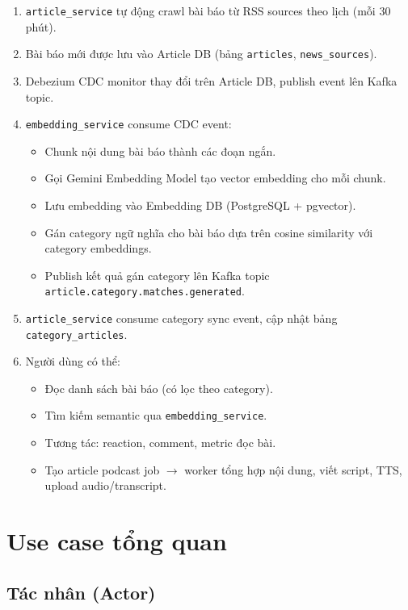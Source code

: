 \documentclass[14pt,a4paper,oneside]{extreport}
\begin{document}
\begin{enumerate}[leftmargin=2cm]
  \item \texttt{article\_service} tự động crawl bài báo từ RSS sources theo lịch (mỗi 30 phút).
  \item Bài báo mới được lưu vào Article DB (bảng \texttt{articles}, \texttt{news\_sources}).
  \item Debezium CDC monitor thay đổi trên Article DB, publish event lên Kafka topic.
  \item \texttt{embedding\_service} consume CDC event:
    \begin{itemize}
      \item Chunk nội dung bài báo thành các đoạn ngắn.
      \item Gọi Gemini Embedding Model tạo vector embedding cho mỗi chunk.
      \item Lưu embedding vào Embedding DB (PostgreSQL + pgvector).
      \item Gán category ngữ nghĩa cho bài báo dựa trên cosine similarity với category embeddings.
      \item Publish kết quả gán category lên Kafka topic \texttt{article.category.matches.generated}.
    \end{itemize}
  \item \texttt{article\_service} consume category sync event, cập nhật bảng \texttt{category\_articles}.
  \item Người dùng có thể:
    \begin{itemize}
      \item Đọc danh sách bài báo (có lọc theo category).
      \item Tìm kiếm semantic qua \texttt{embedding\_service}.
      \item Tương tác: reaction, comment, metric đọc bài.
      \item Tạo article podcast job $\rightarrow$ worker tổng hợp nội dung, viết script, TTS, upload audio/transcript.
    \end{itemize}
\end{enumerate}

\section{Use case tổng quan}
\label{sec:usecase-tq}

\subsection{Tác nhân (Actor)}
\end{document}
